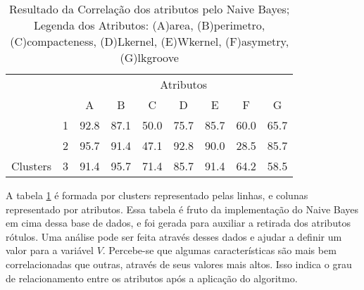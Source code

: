 \begin{table}[!h]
    
    \caption{Resultado da Correlação dos atributos pelo Naive Bayes; Legenda dos Atributos: (A)area, (B)perimetro, (C)compacteness, (D)Lkernel, (E)Wkernel, (F)asymetry, (G)lkgroove}    
    \centering
   \small\addtolength{\tabcolsep}{+2pt}
    \begin{tabular}{|cl|c|c|c|c|c|c|c|}
        \hline \hline
                                &   & \multicolumn{7}{c|}{Atributos}          \\ \cline{3-9} 
        \multicolumn{1}{|l}{}                            &   & A    & B & C & D & E & F & G \\ \hline
        \multicolumn{1}{|c|}{}                           & 1 & 92.8 & 87.1   & 50.0      & 75.7 & 85.7 & 60.0   & 65.7   \\ \cline{2-9} 
        \multicolumn{1}{|c|}{}                           & 2 & 95.7 & 91.4   & 47.1      & 92.8 & 90.0 & 28.5  & 85.7  \\ \cline{2-9} 
        \multicolumn{1}{|c|}{\multirow{-3}{*}{Clusters}} & 3 & 91.4 & 95.7   & 71.4      & 85.7 & 91.4 & 64.2  & 58.5  \\ \hline
    \end{tabular}
    \label{tab:matrelevancia:seeds:nb} 
\end{table}

A tabela \ref{tab:matrelevancia:seeds:nb} é formada por clusters representado pelas linhas, e colunas representado por atributos. Essa tabela é fruto da implementação do Naive Bayes em cima dessa base de dados, e foi  gerada para auxiliar a retirada dos atributos rótulos. Uma análise pode ser feita através desses dados e ajudar a definir um valor para a variável ${V}$. Percebe-se que algumas características são mais bem correlacionadas que  outras, através de seus valores mais altos. Isso indica o grau de relacionamento entre os atributos após a aplicação do algoritmo. 


